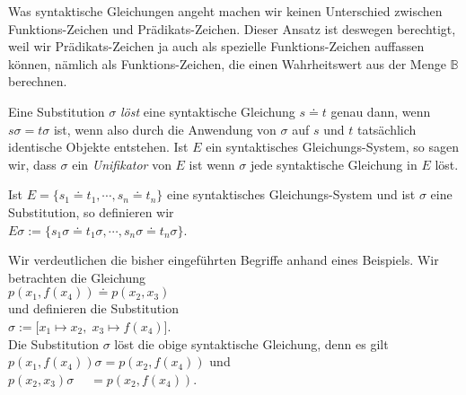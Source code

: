 Was syntaktische Gleichungen angeht machen wir keinen Unterschied zwischen Funktions-Zeichen und
Pr\"{a}dikats-Zeichen.   Dieser Ansatz ist deswegen berechtigt, weil wir Pr\"{a}dikats-Zeichen
ja auch als spezielle Funktions-Zeichen auffassen k\"{o}nnen, n\"{a}mlich als 
Funktions-Zeichen, die einen Wahrheitswert aus der Menge   $\mathbb{B}$ berechnen.

\begin{Definition}[Unifikator]
Eine Substitution $\sigma$ \emph{l\"{o}st} eine syntaktische Gleichung $s \doteq t$ genau dann, wenn
$s\sigma = t\sigma$ ist, wenn also durch die Anwendung von $\sigma$ auf $s$ und $t$
tats\"{a}chlich identische Objekte entstehen.  Ist $E$ ein syntaktisches Gleichungs-System, so 
sagen wir, dass $\sigma$ ein \emph{Unifikator} von $E$ ist wenn $\sigma$ jede
syntaktische Gleichung in $E$ l\"{o}st. 
\eox
\end{Definition}
Ist $E = \{ s_1 \doteq t_1, \cdots, s_n \doteq t_n \}$ eine syntaktisches Gleichungs-System
und ist $\sigma$ eine Substitution, so definieren wir \\[0.2cm]
\hspace*{1.3cm}  $E\sigma := \{ s_1\sigma \doteq t_1\sigma, \cdots, s_n\sigma \doteq t_n\sigma \}$.
\vspace{0.3cm}


\example
 Wir verdeutlichen die bisher eingef\"{u}hrten Begriffe anhand eines
Beispiels.  
Wir betrachten die Gleichung \\[0.2cm]
\hspace*{1.3cm} $p(x_1, f(x_4)) \doteq p( x_2, x_3)$ \\[0.2cm]
und definieren die Substitution \\[0.2cm]
\hspace*{1.3cm} $\sigma := \big[ x_1 \mapsto x_2,\; x_3 \mapsto f(x_4) \big]$. \\[0.2cm]
Die Substitution $\sigma$ l\"{o}st die obige syntaktische Gleichung, denn es gilt \\[0.2cm]
\hspace*{1.3cm} $p(x_1, f(x_4))\sigma = p(x_2, f(x_4))$ \quad und \quad \\[0.2cm]
\hspace*{1.3cm} $p(x_2, x_3)\sigma \;\quad = p(x_2, f(x_4))$.  \eox


